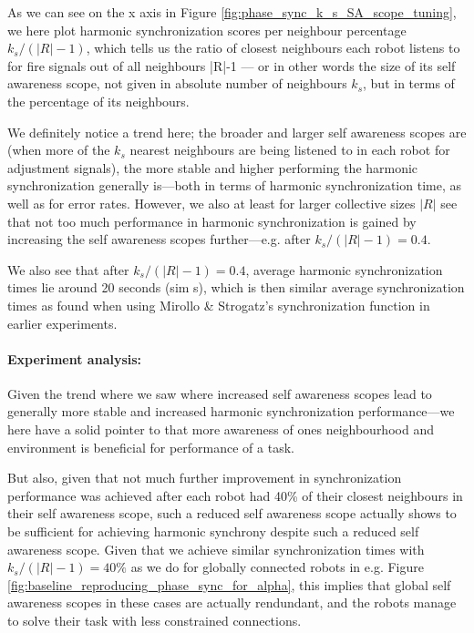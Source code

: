 				As we can see on the x axis in Figure \ref{fig:phase_sync_k_s_SA_scope_tuning}, we here plot harmonic synchronization scores per neighbour percentage $k_s/(|R|-1)$, which tells us the ratio of closest neighbours each robot listens to for fire signals out of all neighbours |R|-1 — or in other words the size of its self awareness scope, not given in absolute number of neighbours $k_s$, but in terms of the percentage of its neighbours.
				
				We definitely notice a trend here; the broader and larger self awareness scopes are (when more of the $k_s$ nearest neighbours are being listened to in each robot for adjustment signals), the more stable and higher performing the harmonic synchronization generally is—both in terms of harmonic synchronization time, as well as for error rates. However, we also at least for larger collective sizes $|R|$ see that not too much performance in harmonic synchronization is gained by increasing the self awareness scopes further—e.g. after $k_s/(|R|-1)=0.4$.
				
				We also see that after $k_s/(|R|-1)=0.4$, average harmonic synchronization times lie around 20 seconds (sim s), which is then similar average synchronization times as found when using Mirollo \& Strogatz's synchronization function in earlier experiments.
				
				\paragraph{Experiment analysis:\nl}
				
				Given the trend where we saw where increased self awareness scopes lead to generally more stable and increased harmonic synchronization performance—we here have a solid pointer to that more awareness of ones neighbourhood and environment is beneficial for performance of a task.
				
				But also, given that not much further improvement in synchronization performance was achieved after each robot had 40\% of their closest neighbours in their self awareness scope, such a reduced self awareness scope actually shows to be sufficient for achieving harmonic synchrony despite such a reduced self awareness scope. Given that we achieve similar synchronization times with $k_s/(|R|-1)=40\%$ as we do for globally connected robots in e.g. Figure \ref{fig:baseline_reproducing_phase_sync_for_alpha}, this implies that global self awareness scopes in these cases are actually rendundant, and the robots manage to solve their task with less constrained connections.
				
